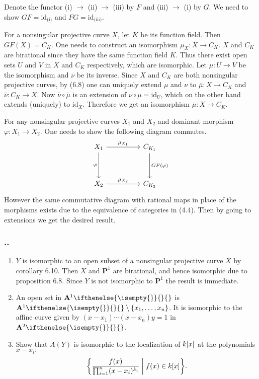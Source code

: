 \documentclass{note}
\newcounter{exercise}[section]
\newcommand{\Ex}{%
    \stepcounter{exercise}%
    \subsubsection*{\thesection.\arabic{exercise}.}%
}
\newcommand{\Affine}[2][]{\mathbf{A}^{#2}\ifthenelse{\isempty{#1}}{}{_{#1}}}
\newcommand{\Proj}[1]{\mathbf{P}^{#1}}
\newcommand{\id}{\mathrm{id}}
\begin{document}


Denote the functor (i) $\to$ (ii) $\to$ (iii) by $F$ and (iii) $\to$ (i) by
$G$. We need to show $GF=\id_{\text{(i)}}$ and $FG=\id_{\text{(iii)}}$.

For a nonsingular projective curve $X$, let $K$ be its function field. Then
$GF(X) = C_K$. One needs to construct an isomorphism $\mu_X\colon X\to C_K$.
$X$ and $C_K$ are birational since they have the same function field $K$. Thus
there exist open sets $U$ and $V$ in $X$ and $C_K$ respectively, which are
isomorphic. Let $\mu\colon U\to V$ be the isomorphism and $\nu$ be its inverse.
Since $X$ and $C_K$ are both nonsingular projective curves, by (6.8) one can
uniquely extend $\mu$ and $\nu$ to $\bar\mu\colon X\to C_K$ and $\bar\nu\colon
  C_K\to X$. Now $\bar\nu\circ\bar\mu$ is an extension of $\nu\circ\mu = \id_U$,
which on the other hand extends (uniquely) to $\id_X$. Therefore we get an
isomorphism $\bar\mu\colon X\to C_K$.

For any nonsingular projective curves $X_1$ and $X_2$ and dominant morphism
$\varphi\colon X_1\to X_2$. One needs to show the following diagram commutes.
\begin{equation*}
  \begin{tikzcd}[row sep=huge,column sep=huge]
    X_1 \arrow{r}{\mu_{X_1}} \arrow[swap]{d}{\varphi} & C_{K_1}
    \arrow{d}{GF(\varphi)} \\ X_2 \arrow{r}{\mu_{X_2}} & C_{K_2}
  \end{tikzcd}
\end{equation*}
However the same commutative diagram with rational maps in place of the
morphisms exists due to the equivalence of categories in (4.4). Then by going
to extensions we get the desired result.


\Ex
\begin{enumerate}
  \item $Y$ is isomorphic to an open subset of a nonsingular projective
        curve $X$ by corollary 6.10. Then $X$ and $\Proj1$ are birational, and hence
        isomorphic due to proposition 6.8. Since $Y$ is not isomorphic to $\Proj1$ the
        result is immediate.
  \item An open set in $\Affine1$ is $\Affine1\setminus\set{x_1}{\dots}{x_n}$. It is
        isomorphic to the affine curve given by $(x-x_1)\cdots(x-x_n)y=1$ in
        $\Affine2$.
  \item Show that $A(Y)$ is isomorphic to the localization of $\polynomials{k}{x}$ at
        the polynomials $x-x_i\colon$
        \begin{equation*}
          \set{\frac{f(x)}{\prod_{i=1}^n(x-x_i)^{k_i}} \biggm\vert f(x) \in
            \polynomials{k}{x}}.
        \end{equation*}
\end{enumerate}
\end{document}

